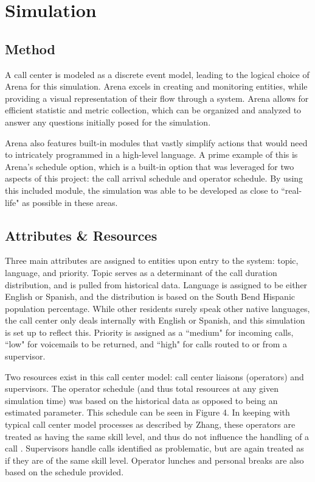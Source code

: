 \documentclass[12pt]{article}
\begin{document}
\section{Simulation}

	\subsection{Method}
	
A call center is modeled as a discrete event model, leading to the logical choice of Arena for this simulation.  Arena excels in creating and monitoring entities, while providing a visual representation of their flow through a system.  Arena allows for efficient statistic and metric collection, which can be organized and analyzed to answer any questions initially posed for the simulation.

\par

Arena also features built-in modules that vastly simplify actions that would need to intricately programmed in a high-level language.  A prime example of this is Arena's schedule option, which is a built-in option that was leveraged for two aspects of this project:  the call arrival schedule and operator schedule.  By using this included module, the simulation was able to be developed as close to ``real-life" as possible in these areas.
	
	\subsection{Attributes \& Resources}

Three main attributes are assigned to entities upon entry to the system:  topic, language, and priority.  Topic serves as a determinant of the call duration distribution, and is pulled from historical data.  Language is assigned to be either English or Spanish, and the distribution is based on the South Bend Hispanic population percentage.  While other residents surely speak other native languages, the call center only deals internally with English or Spanish, and this simulation is set up to reflect this.  Priority is assigned as a ``medium" for incoming calls, ``low" for voicemails to be returned, and ``high" for calls routed to or from a supervisor.

\par

Two resources exist in this call center model:  call center liaisons (operators) and supervisors.  The operator schedule (and thus total resources at any given simulation time) was based on the historical data as opposed to being an estimated parameter.  This schedule can be seen in Figure 4.  In keeping with typical call center model processes as described by Zhang, these operators are treated as having the same skill level, and thus do not influence the handling of a call \cite{zhang}.  Supervisors handle calls identified as problematic, but are again treated as if they are of the same skill level.  Operator lunches and personal breaks are also based on the schedule provided.
\end{document}
